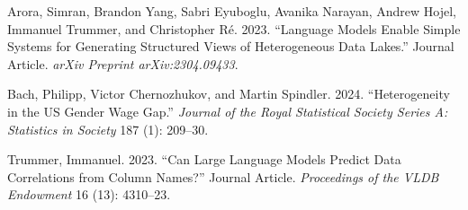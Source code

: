 \documentclass[
  11pt,
]{article}
\newlength{\cslhangindent}
\newenvironment{CSLReferences}[2] %
 {\begin{list}{}{%
  \setlength{\itemindent}{0pt}
  \setlength{\leftmargin}{0pt}
  \setlength{\parsep}{0pt}
  \ifodd #1
   \setlength{\leftmargin}{\cslhangindent}
   \setlength{\itemindent}{-1\cslhangindent}
  \fi
  \setlength{\itemsep}{#2\baselineskip}}}
 {\end{list}}
\begin{document}
\label{refs}
\begin{CSLReferences}{1}{0}
Arora, Simran, Brandon Yang, Sabri Eyuboglu, Avanika Narayan, Andrew
Hojel, Immanuel Trummer, and Christopher Ré. 2023. {``Language Models
Enable Simple Systems for Generating Structured Views of Heterogeneous
Data Lakes.''} Journal Article. \emph{arXiv Preprint arXiv:2304.09433}.

Bach, Philipp, Victor Chernozhukov, and Martin Spindler. 2024.
{``Heterogeneity in the US Gender Wage Gap.''} \emph{Journal of the
Royal Statistical Society Series A: Statistics in Society} 187 (1):
209--30.

Trummer, Immanuel. 2023. {``Can Large Language Models Predict Data
Correlations from Column Names?''} Journal Article. \emph{Proceedings of
the VLDB Endowment} 16 (13): 4310--23.

\end{CSLReferences}
\end{document}

